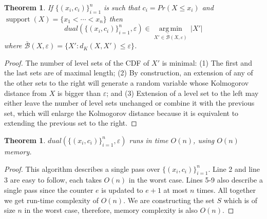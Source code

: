 \documentclass[letterpaper]{article} %
\newtheorem{theorem}[thm]{Theorem}
\DeclareMathOperator{\supp}{support}
\begin{document}

\begin{theorem}\label{the:correctnessDual}
	If  $\{(x_i, c_i)\}_{i=1}^n$ is such that $c_i=Pr(X \leq x_i)$ and $\supp(X)=\{x_1 < \cdots < x_n\}$ then  
    $$dual(\{(x_i, c_i)\}_{i=1}^n,\varepsilon) \in \underset{X'\in \bar{\mathcal{B}}(X,\varepsilon)}{\operatorname{arg\,min}}\, |X'|$$  where $\bar{\mathcal{B}}(X,\varepsilon)=\{X'\colon d_K(X,X')\leq \varepsilon\}$.
\end{theorem}
\begin{proof}
The number of level sets of the CDF of $X'$ is minimal: (1) The first and the last sets are of maximal length; (2) By construction, an extension of any of the other sets to the right will generate a random variable whose Kolmogorov distance from $X$ is bigger than $\varepsilon$; and (3) Extension of a level set to the left may either leave the number of level sets unchanged or combine it with the previous set, which will enlarge the Kolmogorov distance because it is equivalent to extending the previous set to the right.
\end{proof}



\begin{theorem}\label{the:complexityDual}
	$dual(\{(x_i, c_i)\}_{i=1}^n,\varepsilon)$ runs in time $O(n)$, using $O(n)$ memory.
\end{theorem}
\begin{proof}
This algorithm describes a single pass over $\{(x_i, c_i)\}_{i=1}^n$. Line 2 and line 3 are easy to follow, each takes $O(n)$ in the worst case. Lines 5-9 also describe a single pass since the counter $e$ is updated to $e+1$ at most $n$ times. All together we get run-time complexity of $O(n)$. We are constructing the set $S$ which is of size $n$ in the worst case, therefore, memory complexity is also $O(n)$. 
\end{proof}
\end{document}
